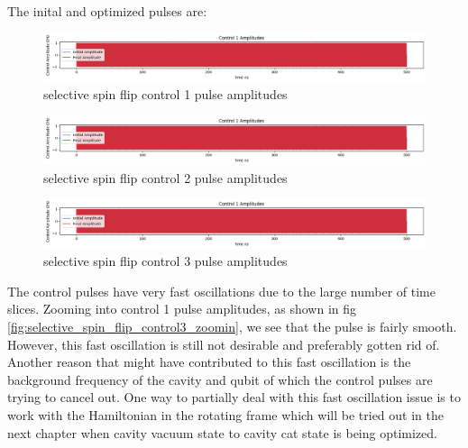\documentclass[12pt]{report}
\begin{document}
The inital and optimized pulses are: 
\begin{figure}[H]
    \centering
    \includegraphics[width=0.95\linewidth]{selective_spin_flip_GRAPE_control1.png}
    \caption{selective spin flip control 1 pulse amplitudes}
    \label{fig:selective_spin_flip_control1}
\end{figure}
\begin{figure}[H]
    \centering
    \includegraphics[width=0.95\linewidth]{selective_spin_flip_GRAPE_control1.png}
    \caption{selective spin flip control 2 pulse amplitudes}
    \label{fig:selective_spin_flip_control2}
\end{figure}
\begin{figure}[H]
    \centering
    \includegraphics[width=0.95\linewidth]{selective_spin_flip_GRAPE_control1.png}
    \caption{selective spin flip control 3 pulse amplitudes}
    \label{fig:selective_spin_flip_control3}
\end{figure}

The control pulses have very fast oscillations due to the large number of time slices.
Zooming into control 1 pulse amplitudes, as shown in fig \ref{fig:selective_spin_flip_control3_zoomin},
we see that the pulse is fairly smooth. However, this fast oscillation is still not desirable and preferably gotten rid of. 
Another reason that might have contributed to this fast oscillation is the background frequency of the cavity and qubit 
of which the control pulses are trying to cancel out. One way to partially deal with this fast oscillation issue is to work
with the Hamiltonian in the rotating frame which will be tried out in the next chapter when cavity vacuum state to cavity cat state
is being optimized.  
\end{document}
